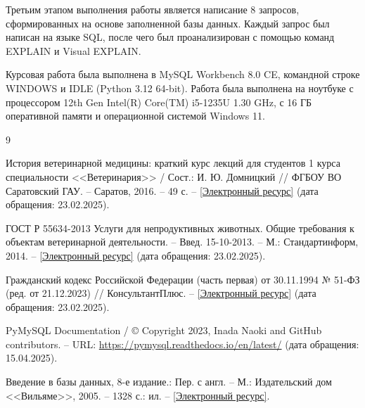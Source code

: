 \documentclass[a4paper]{article}
\begin{document}
Третьим этапом выполнения работы является написание 8 запросов, сформированных на основе заполненной базы данных. Каждый запрос был написан на языке SQL, после чего был проанализирован с помощью команд EXPLAIN и Visual EXPLAIN.

Курсовая работа была выполнена в MySQL Workbench 8.0 CE, командной строке WINDOWS и IDLE (Python 3.12 64-bit). Работа была выполнена на ноутбуке с процессором 12th Gen Intel(R) Core(TM) i5-1235U 1.30 GHz, с 16 ГБ оперативной памяти и операционной системой Windows 11. 

\newpage
{}
\begin{thebibliography}{9}

История ветеринарной медицины: краткий курс лекций для студентов 1 курса специальности <<Ветеринария>> / Сост.: И. Ю. Домницкий // ФГБОУ ВО Саратовский ГАУ. -- Саратов, 2016. -- 49 с. -- \href{https://www.vavilovsar.ru/files/pages/27419/14695212024.pdf?ysclid=maoj3ss533146082256}{[Электронный ресурс]} (дата обращения: 23.02.2025).

ГОСТ Р 55634-2013 Услуги для непродуктивных животных. Общие требования к объектам ветеринарной деятельности. -- Введ. 15-10-2013. -- М.: Стандартинформ, 2014. -- \href{https://rosgosts.ru/file/gost/03/080/gost_r_55634-2013.pdf?ysclid=maojq5zar784187663}{[Электронный ресурс]} (дата обращения: 23.02.2025).

Гражданский кодекс Российской Федерации (часть первая) от 30.11.1994 № 51-ФЗ (ред. от 21.12.2023) // КонсультантПлюс. -- \href{https://www.consultant.ru/document/cons_doc_LAW_4438/}{[Электронный ресурс]} (дата обращения: 23.02.2025).

PyMySQL Documentation / © Copyright 2023, Inada Naoki and GitHub contributors. -- URL: \url{https://pymysql.readthedocs.io/en/latest/} (дата обращения: 15.04.2025).

Введение в базы данных, 8-е издание.: Пер. с англ. -- М.: Издательский дом <<Вильяме>>, 2005. -- 1328 с.: ил. -- \href{https://psv4.userapi.com/s/v1/d/VowyPmr2QvUTLu8vP92jfnmiF3y3nCbJGZQxaINjPrzxtEkhhkR1p1rBlfDnRLGh2vle9lpvcvYZrJM-t4wVZ5nSjDBvWlmX0gNjWQLFObV18BDwNLQmRQ/Deyt_-_Vvedenie_v_sistemy_baz_dannykh.pdf}{[Электронный ресурс]}.

\end{thebibliography}

\newpage
\end{document}
